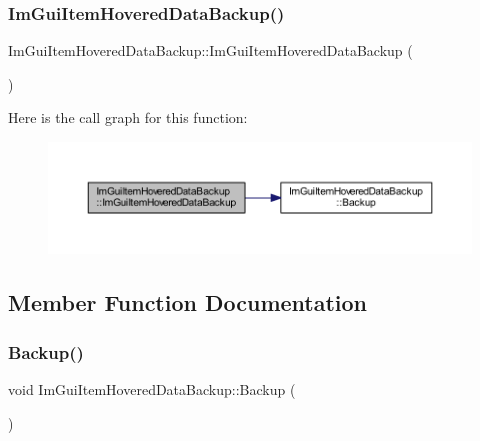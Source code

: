 \subsubsection{\texorpdfstring{Im\+Gui\+Item\+Hovered\+Data\+Backup()}{ImGuiItemHoveredDataBackup()}}
{\footnotesize\ttfamily Im\+Gui\+Item\+Hovered\+Data\+Backup\+::\+Im\+Gui\+Item\+Hovered\+Data\+Backup (\begin{DoxyParamCaption}{ }\end{DoxyParamCaption})\hspace{0.3cm}{\ttfamily [inline]}}

Here is the call graph for this function\+:
\nopagebreak
\begin{figure}[H]
\begin{center}
\leavevmode
\includegraphics[width=350pt]{struct_im_gui_item_hovered_data_backup_a242a83a1258e1366ebfecce938c83604_cgraph}
\end{center}
\end{figure}


\subsection{Member Function Documentation}
\mbox{\label{struct_im_gui_item_hovered_data_backup_a2084500d9cbc9455e52fbe87c95f2315}} 
\subsubsection{\texorpdfstring{Backup()}{Backup()}}
{\footnotesize\ttfamily void Im\+Gui\+Item\+Hovered\+Data\+Backup\+::\+Backup (\begin{DoxyParamCaption}{ }\end{DoxyParamCaption})\hspace{0.3cm}{\ttfamily [inline]}}


